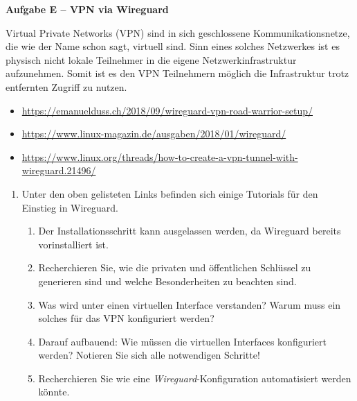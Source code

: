 \documentclass[paper=a4,fontsize=11pt]{scrartcl}%
\begin{document}
\begin{center}\Large{\textbf{Aufgabe E -- VPN via Wireguard}}\end{center}\vskip0.25in
Virtual Private Networks (VPN) sind in sich geschlossene Kommunikationsnetze, die wie der Name schon sagt, virtuell sind. Sinn eines solches Netzwerkes ist es physisch nicht lokale Teilnehmer in die eigene Netzwerkinfrastruktur aufzunehmen. Somit ist es den VPN Teilnehmern möglich die Infrastruktur trotz entfernten Zugriff zu nutzen.
\begin{itemize}
	\item \url{https://emanuelduss.ch/2018/09/wireguard-vpn-road-warrior-setup/}
	\item \url{https://www.linux-magazin.de/ausgaben/2018/01/wireguard/}
	\item \url{https://www.linux.org/threads/how-to-create-a-vpn-tunnel-with-wireguard.21496/}
\end{itemize}
\begin{enumerate}
	\item Unter den oben gelisteten Links befinden sich einige Tutorials für den Einstieg in Wireguard.
	\begin{enumerate}
		\item Der Installationsschritt kann ausgelassen werden, da Wireguard bereits vorinstalliert ist.
		\item Recherchieren Sie, wie die privaten und öffentlichen Schlüssel zu generieren sind und welche Besonderheiten zu beachten sind.
		\item Was wird unter einen virtuellen Interface verstanden? Warum muss ein solches für das VPN konfiguriert werden?
		\item Darauf aufbauend: Wie müssen die virtuellen Interfaces konfiguriert werden? Notieren Sie sich alle notwendigen Schritte!
		\item Recherchieren Sie wie eine \emph{Wireguard}-Konfiguration automatisiert werden könnte.
	\end{enumerate}
\end{enumerate}	
\end{document}
